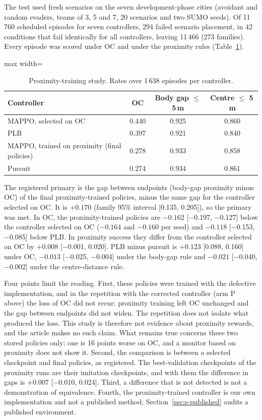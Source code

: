 \documentclass[preprint,12pt]{elsarticle}
\begin{document}
The test used fresh scenarios on the seven development-phase cities (avoidant and random evaders, teams of 3, 5 and
7, 20 scenarios and two SUMO seeds). Of 11\,760 scheduled episodes for seven controllers, 294 failed scenario
placement, in 42 conditions that fail identically for all controllers, leaving 11\,466 (273 families). Every episode
was scored under OC and under the proximity rules (Table~\ref{tab:s-prox}).

\begin{table}[!h]
\centering
\caption{Proximity-training study. Rates over 1\,638 episodes per controller.}
\label{tab:s-prox}
\begin{adjustbox}{max width=\textwidth}
\begin{tabular}{@{}lccc@{}}
\toprule
Controller & OC & Body gap $\le$ 5\,m & Centre $\le$ 5\,m \\
\midrule
MAPPO, selected on OC & 0.440 & 0.925 & 0.860 \\
PLB & 0.397 & 0.921 & 0.840 \\
MAPPO, trained on proximity (final policies) & 0.278 & 0.933 & 0.858 \\
Pursuit & 0.274 & 0.934 & 0.861 \\
\bottomrule
\end{tabular}
\end{adjustbox}
\end{table}

The registered primary is the gap between endpoints (body-gap proximity minus OC) of the final proximity-trained
policies, minus the same gap for the controller selected on OC. It is $+0.170$ (family 95\% interval [0.135, 0.205]),
so the primary was met. In OC, the proximity-trained policies are $-0.162$ [$-$0.197, $-$0.127] below the controller
selected on OC ($-0.164$ and $-0.160$ per seed) and $-0.118$ [$-$0.153, $-$0.085] below PLB. In proximity success they
differ from the controller selected on OC by $+0.008$ [$-$0.001, 0.020]. PLB minus pursuit is $+0.123$ [0.088, 0.160]
under OC, $-0.013$ [$-$0.025, $-$0.004] under the body-gap rule and $-0.021$ [$-$0.040, $-$0.002] under the
centre-distance rule.

Four points limit the reading. First, these policies were trained with the defective implementation, and in the
repetition with the corrected controller (arm P above) the loss of OC did not recur: proximity training left OC
unchanged and the gap between endpoints did not widen. The repetition does not isolate what produced the loss. This
study is therefore not evidence about proximity rewards, and the article makes no such claim. What remains true concerns
these two stored policies only: one is 16 points worse on OC, and a monitor based on proximity does not show it. Second, the comparison is between a
selected checkpoint and final policies, as registered. The best-validation checkpoints of the proximity runs are
their imitation checkpoints, and with them the difference in gaps is $+0.007$ [$-$0.010, 0.024]. Third, a difference
that is not detected is not a demonstration of equivalence. Fourth, the proximity-trained controller is our own
implementation and not a published method; Section~\ref{sec:s-published} audits a published environment.
\end{document}
